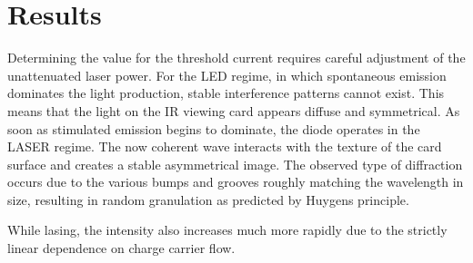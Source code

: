 \section{Results}
\label{sec:results}

Determining the value for the threshold current requires careful adjustment of the unattenuated laser power. For the LED regime,
in which spontaneous emission dominates the light production, stable interference patterns cannot exist. This means that the
light on the IR viewing card appears diffuse and symmetrical. As soon as stimulated emission begins to dominate, the diode
operates in the LASER regime. The now coherent wave interacts with the texture of the card surface and creates a stable asymmetrical
image. The observed type of diffraction occurs due to the various bumps and grooves roughly matching the wavelength in size, resulting
in random granulation as predicted by Huygens principle. 

While lasing, the intensity also increases much more rapidly due to the strictly linear dependence on charge carrier flow.

\enlargethispage{\baselineskip}\pagebreak

